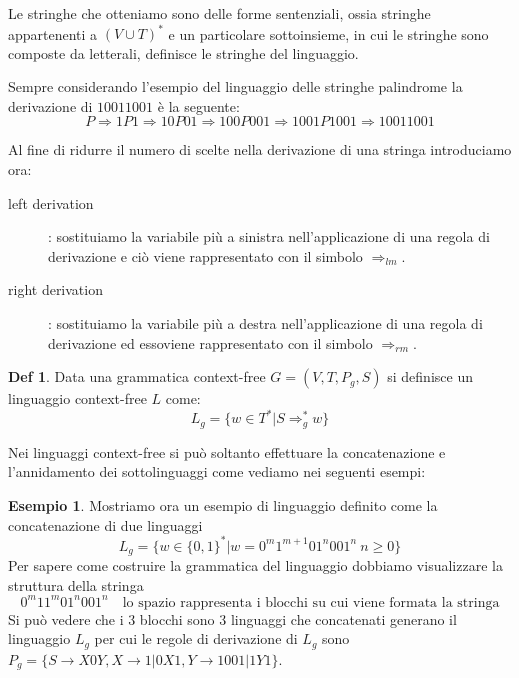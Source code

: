 \documentclass[a4paper]{report}
\theoremstyle{definition}%
\newtheorem*{defi}{Def}%
\newtheorem*{esempio}{Esempio}
\begin{document}
  Le stringhe che otteniamo sono delle forme sentenziali, ossia stringhe appartenenti a $(V \cup T)^*$ e un particolare
  sottoinsieme, in cui le stringhe sono composte da letterali, definisce le stringhe del linguaggio.

  Sempre considerando l'esempio del linguaggio delle stringhe palindrome la derivazione di $10011001$ è la seguente:
  \begin{equation*}
    P \Rightarrow 1P1 \Rightarrow 10P01 \Rightarrow 100P001 \Rightarrow 1001P1001 \Rightarrow 10011001
  \end{equation*}
  
  Al fine di ridurre il numero di scelte nella derivazione di una stringa introduciamo ora:
  \begin{description}
  \item [left derivation]: sostituiamo la variabile più a sinistra nell'applicazione di una regola di derivazione
                           e ciò viene rappresentato con il simbolo $\Rightarrow _{lm}$.

  \item [right derivation]: sostituiamo la variabile più a destra nell'applicazione di una regola di derivazione
                            ed essoviene rappresentato con il simbolo $\Rightarrow _{rm}$.
  \end{description}

  \begin{defi}
    Data una grammatica context-free $G = (V, T, P_g, S)$ si definisce un linguaggio context-free $L$ come:
    \begin{equation*}
      L_g = \{ w \in T^* | S \Rightarrow _g ^* w \}
    \end{equation*}
  \end{defi}

  Nei linguaggi context-free si può soltanto effettuare la concatenazione e l'annidamento dei sottolinguaggi come vediamo
  nei seguenti esempi:
  
  \begin{esempio}
  Mostriamo ora un esempio di linguaggio definito come la concatenazione di due linguaggi
  \begin{equation*}
     L_g = \{ w \in \{0,1\}^* | w = 0^m 1^{m+1}01^n001^n \ n\geq 0\}
  \end{equation*}
  Per sapere come costruire la grammatica del linguaggio dobbiamo visualizzare la struttura della stringa
  \begin{equation*}
    0^m11^m 0 1^n001^n  \quad \text{lo spazio rappresenta i blocchi su cui viene formata la stringa}
  \end{equation*}
  Si può vedere che i 3 blocchi sono 3 linguaggi che concatenati generano il linguaggio $L_g$ per cui le regole
  di derivazione di $L_g$ sono $P_g = \{S \to X0Y, X \to 1 | 0X1, Y \to 1001 | 1Y1\}$.
  \end{esempio}
  
\end{document}
